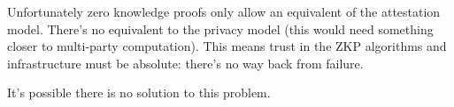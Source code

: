 \documentclass{article}
\begin{document}
Unfortunately zero knowledge proofs only allow an equivalent of the attestation model. There's no equivalent to the
privacy model (this would need something closer to multi-party computation). This means trust in the ZKP algorithms
and infrastructure must be absolute: there's no way back from failure.

It's possible there is no solution to this problem.



\end{document}
